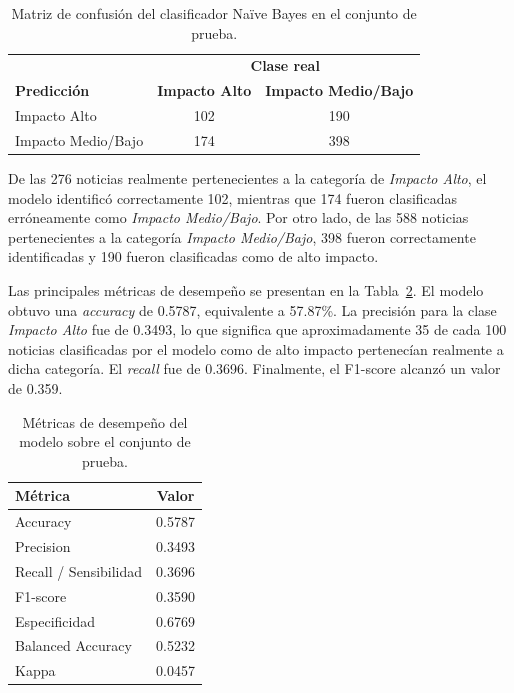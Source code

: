 \documentclass{Academic}
\begin{document}
\begin{table}[htbp]
\centering
\caption{Matriz de confusión del clasificador Naïve Bayes en el conjunto de prueba.}
\label{tab:confusion}

\begin{tabular}{lcc}
\hline
& \multicolumn{2}{c}{\textbf{Clase real}} \\
\textbf{Predicción} & \textbf{Impacto Alto} & \textbf{Impacto Medio/Bajo} \\
\hline
Impacto Alto       & 102 & 190 \\
Impacto Medio/Bajo & 174 & 398 \\
\hline
\end{tabular}

\end{table}

De las 276 noticias realmente pertenecientes a la categoría de \textit{Impacto Alto}, el 
modelo identificó correctamente 102, mientras que 174 fueron clasificadas erróneamente como \textit{Impacto Medio/Bajo}. Por otro lado, 
de las 588 noticias pertenecientes a la categoría \textit{Impacto Medio/Bajo}, 398 fueron 
correctamente identificadas y 190 fueron clasificadas como de alto impacto.

Las principales métricas de desempeño se presentan en la Tabla~\ref{tab:metricas}. El modelo 
obtuvo una \textit{accuracy} de 0.5787, equivalente a 57.87\%. La precisión para la clase 
\textit{Impacto Alto} fue de 0.3493, lo que significa que aproximadamente 35 de cada 100 
noticias clasificadas por el modelo como de alto impacto pertenecían realmente a dicha categoría. 
El \textit{recall} fue de 0.3696. Finalmente, el F1-score alcanzó 
un valor de 0.359.

\begin{table}[htbp]
\centering
\caption{Métricas de desempeño del modelo sobre el conjunto de prueba.}
\label{tab:metricas}

\begin{tabular}{lc}
\hline
\textbf{Métrica} & \textbf{Valor} \\
\hline
Accuracy & 0.5787 \\
Precision & 0.3493 \\
Recall / Sensibilidad & 0.3696 \\
F1-score & 0.3590 \\
Especificidad & 0.6769 \\
Balanced Accuracy & 0.5232 \\
Kappa & 0.0457 \\
\hline
\end{tabular}

\end{table}
\end{document}
